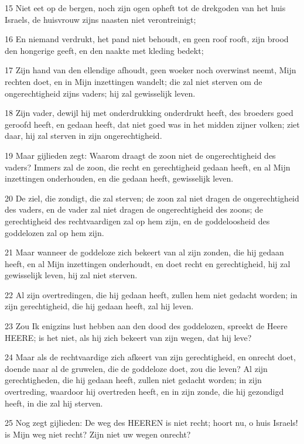 \par 15 Niet eet op de bergen, noch zijn ogen opheft tot de drekgoden van het huis Israels, de huisvrouw zijns naasten niet verontreinigt;
\par 16 En niemand verdrukt, het pand niet behoudt, en geen roof rooft, zijn brood den hongerige geeft, en den naakte met kleding bedekt;
\par 17 Zijn hand van den ellendige afhoudt, geen woeker noch overwinst neemt, Mijn rechten doet, en in Mijn inzettingen wandelt; die zal niet sterven om de ongerechtigheid zijns vaders; hij zal gewisselijk leven.
\par 18 Zijn vader, dewijl hij met onderdrukking onderdrukt heeft, des broeders goed geroofd heeft, en gedaan heeft, dat niet goed was in het midden zijner volken; ziet daar, hij zal sterven in zijn ongerechtigheid.
\par 19 Maar gijlieden zegt: Waarom draagt de zoon niet de ongerechtigheid des vaders? Immers zal de zoon, die recht en gerechtigheid gedaan heeft, en al Mijn inzettingen onderhouden, en die gedaan heeft, gewisselijk leven.
\par 20 De ziel, die zondigt, die zal sterven; de zoon zal niet dragen de ongerechtigheid des vaders, en de vader zal niet dragen de ongerechtigheid des zoons; de gerechtigheid des rechtvaardigen zal op hem zijn, en de goddeloosheid des goddelozen zal op hem zijn.
\par 21 Maar wanneer de goddeloze zich bekeert van al zijn zonden, die hij gedaan heeft, en al Mijn inzettingen onderhoudt, en doet recht en gerechtigheid, hij zal gewisselijk leven, hij zal niet sterven.
\par 22 Al zijn overtredingen, die hij gedaan heeft, zullen hem niet gedacht worden; in zijn gerechtigheid, die hij gedaan heeft, zal hij leven.
\par 23 Zou Ik enigzins lust hebben aan den dood des goddelozen, spreekt de Heere HEERE; is het niet, als hij zich bekeert van zijn wegen, dat hij leve?
\par 24 Maar als de rechtvaardige zich afkeert van zijn gerechtigheid, en onrecht doet, doende naar al de gruwelen, die de goddeloze doet, zou die leven? Al zijn gerechtigheden, die hij gedaan heeft, zullen niet gedacht worden; in zijn overtreding, waardoor hij overtreden heeft, en in zijn zonde, die hij gezondigd heeft, in die zal hij sterven.
\par 25 Nog zegt gijlieden: De weg des HEEREN is niet recht; hoort nu, o huis Israels! is Mijn weg niet recht? Zijn niet uw wegen onrecht?
